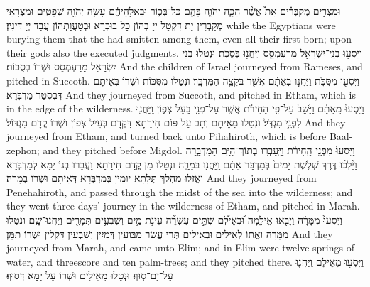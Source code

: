 {וּמִצְרַ֣יִם מְקַבְּרִ֗ים אֵת֩ אֲשֶׁ֨ר הִכָּ֧ה יְהֹוָ֛ה בָּהֶ֖ם כׇּל־בְּכ֑וֹר וּבֵאלֹ֣הֵיהֶ֔ם עָשָׂ֥ה יְהֹוָ֖ה שְׁפָטִֽים׃
}
{וּמִצְרָאֵי מְקַבְּרִין יָת דִּקְטַל יְיָ בְּהוֹן כָּל בּוּכְרָא וּבְטָעֲוָתְהוֹן עֲבַד יְיָ דִּינִין׃}
{while the Egyptians were burying them that the \lord\space had smitten among them, even all their first-born; upon their gods also the \lord\space executed judgments.}{}
{וַיִּסְע֥וּ בְנֵֽי־יִשְׂרָאֵ֖ל מֵרַעְמְסֵ֑ס וַֽיַּחֲנ֖וּ בְּסֻכֹּֽת׃}
{וּנְטַלוּ בְנֵי יִשְׂרָאֵל מֵרַעְמְסֵס וּשְׁרוֹ בְסֻכּוֹת׃}
{And the children of Israel journeyed from Rameses, and pitched in Succoth.}{}
{וַיִּסְע֖וּ מִסֻּכֹּ֑ת וַיַּחֲנ֣וּ בְאֵתָ֔ם אֲשֶׁ֖ר בִּקְצֵ֥ה הַמִּדְבָּֽר׃}
{וּנְטַלוּ מִסֻּכּוֹת וּשְׁרוֹ בְּאֵיתָם דְּבִסְטַר מַדְבְּרָא׃}
{And they journeyed from Succoth, and pitched in Etham, which is in the edge of the wilderness.}{}
{וַיִּסְעוּ֙ מֵֽאֵתָ֔ם וַיָּ֙שׇׁב֙ עַל־פִּ֣י הַחִירֹ֔ת אֲשֶׁ֥ר עַל־פְּנֵ֖י בַּ֣עַל צְפ֑וֹן וַֽיַּחֲנ֖וּ לִפְנֵ֥י מִגְדֹּֽל׃}
{וּנְטַלוּ מֵאֵיתָם וְתָב עַל פּוֹם חִירָתָא דִּקְדָם בְּעֵיל צְפוֹן וּשְׁרוֹ קֳדָם מִגְדּוֹל׃}
{And they journeyed from Etham, and turned back unto Pihahiroth, which is before Baal-zephon; and they pitched before Migdol.}{}
{וַיִּסְעוּ֙ מִפְּנֵ֣י הַֽחִירֹ֔ת וַיַּֽעַבְר֥וּ בְתוֹךְ־הַיָּ֖ם הַמִּדְבָּ֑רָה וַיֵּ֨לְכ֜וּ דֶּ֣רֶךְ שְׁלֹ֤שֶׁת יָמִים֙ בְּמִדְבַּ֣ר אֵתָ֔ם וַֽיַּחֲנ֖וּ בְּמָרָֽה׃}
{וּנְטַלוּ מִן קֳדָם חִירָתָא וַעֲבַרוּ בְגוֹ יַמָּא לְמַדְבְּרָא וַאֲזַלוּ מַהְלַךְ תְּלָתָא יוֹמִין ‏‏בְּמַדְבְּרָא דְּאֵיתָם וּשְׁרוֹ בְמָרָה׃}
{And they journeyed from Penehahiroth, and passed through the midst of the sea into the wilderness; and they went three days’ journey in the wilderness of Etham, and pitched in Marah.}{}
{וַיִּסְעוּ֙ מִמָּרָ֔ה וַיָּבֹ֖אוּ אֵילִ֑מָה וּ֠בְאֵילִ֠ם שְׁתֵּ֣ים עֶשְׂרֵ֞ה עֵינֹ֥ת מַ֛יִם וְשִׁבְעִ֥ים תְּמָרִ֖ים וַיַּחֲנוּ־שָֽׁם׃}
{וּנְטַלוּ מִמָּרָה וַאֲתוֹ לְאֵילִים וּבְאֵילִים תְּרֵי עֲשַׂר מַבּוּעִין דְּמַיִין וְשִׁבְעִין דִּקְלִין וּשְׁרוֹ תַמָּן׃}
{And they journeyed from Marah, and came unto Elim; and in Elim were twelve springs of water, and threescore and ten palm-trees; and they pitched there.}{}
{וַיִּסְע֖וּ מֵאֵילִ֑ם וַֽיַּחֲנ֖וּ עַל־יַם־סֽוּף׃}
{וּנְטַלוּ מֵאֵילִים וּשְׁרוֹ עַל יַמָּא דְּסוּף׃}
